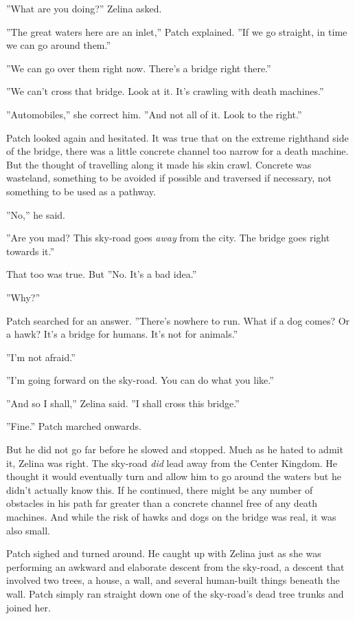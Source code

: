 \documentclass[12pt]{book}
\begin{document}
''What are you doing?'' Zelina asked.

''The great waters here are an inlet,'' Patch explained. ''If we go straight, in time we can go around them.''

''We can go over them right now. There's a bridge right there.''

''We can't cross that bridge. Look at it. It's crawling with death machines.''

''Automobiles,'' she correct him. ''And not all of it. Look to the right.''

Patch looked again and hesitated. It was true that on the extreme righthand side of the bridge, there was a little concrete channel too narrow for a death machine. But the thought of travelling along it made his skin crawl. Concrete was wasteland, something to be avoided if possible and traversed if necessary, not something to be used as a pathway.

''No,'' he said.

''Are you mad? This sky-road goes {\it away} from the city. The bridge goes right towards it.''

That too was true. But %
''No. It's a bad idea.''

''Why?''

Patch searched for an answer. ''There's nowhere to run. What if a dog comes? Or a hawk? It's a bridge for humans. It's not for animals.''

''I'm not afraid.''

''I'm going forward on the sky-road. You can do what you like.''

''And so I shall,'' Zelina said. ''I shall cross this bridge.''

''Fine.'' Patch marched onwards.

But he did not go far before he slowed and stopped. Much as he hated to admit it, Zelina was right. The sky-road {\it did} lead away from the Center Kingdom. He thought it would eventually turn and allow him to go around the waters %
but he didn't actually know this. If he continued, there might be any number of obstacles in his path far greater than a concrete channel free of any death machines. And while the risk of hawks and dogs on the bridge was real, it was also small.

Patch sighed and turned around. He caught up with Zelina just as she was performing an awkward and elaborate descent from the sky-road, a descent that involved two trees, a house, a wall, and several human-built things beneath the wall. Patch simply ran straight down one of the sky-road's dead tree trunks and joined her.
\end{document}
